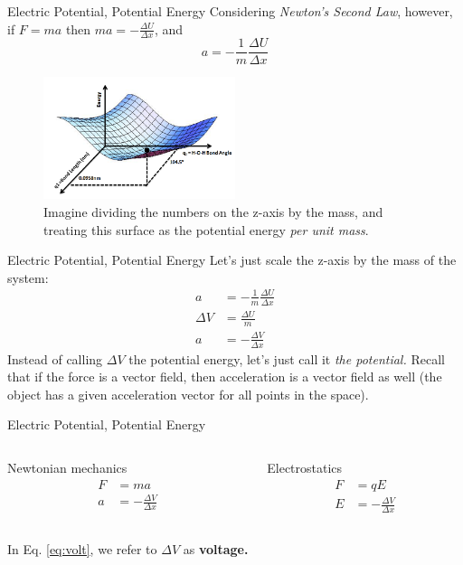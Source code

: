 \documentclass{beamer}
\begin{document}
\begin{frame}{Electric Potential, Potential Energy}
\small
Considering \textit{Newton's Second Law}, however, if $F = m a$ then $m a = -\frac{\Delta U}{\Delta x}$, and
\begin{equation}
a = -\frac{1}{m}\frac{\Delta U}{\Delta x}
\end{equation}
\begin{figure}
\centering
\includegraphics[width=0.5\textwidth]{figures/potential.png}
\caption{\label{fig:potential2} \small Imagine dividing the numbers on the z-axis by the mass, and treating this surface as the potential energy \textit{per unit mass}.}
\end{figure}
\end{frame}

\begin{frame}{Electric Potential, Potential Energy}
\small
Let's just scale the z-axis by the mass of the system:
\begin{align}
a &= -\frac{1}{m}\frac{\Delta U}{\Delta x} \\
\Delta V &= \frac{\Delta U}{m} \\
a &= -\frac{\Delta V}{\Delta x}
\end{align}
Instead of calling $\Delta V$ the potential energy, let's just call it \textit{the potential.}  Recall that if the force is a vector field, then acceleration is a vector field as well (the object has a given acceleration vector for all points in the space).
\end{frame}

\begin{frame}{Electric Potential, Potential Energy}
\begin{columns}[T]
\begin{column}{0.5\textwidth}
\alert{Newtonian mechanics} \\ \hrulefill
\begin{align}
F &= ma \\
a &= -\frac{\Delta V}{\Delta x}
\end{align}
\end{column}
\begin{column}{0.5\textwidth}
\alert{Electrostatics} \\ \hrulefill
\begin{align}
F &= qE \\
E &= -\frac{\Delta V}{\Delta x} \label{eq:volt}
\end{align}
\end{column}
\end{columns} \vspace{1cm}
In Eq. \ref{eq:volt}, we refer to $\Delta V$ as \textbf{voltage.}
\end{frame}
\end{document}
